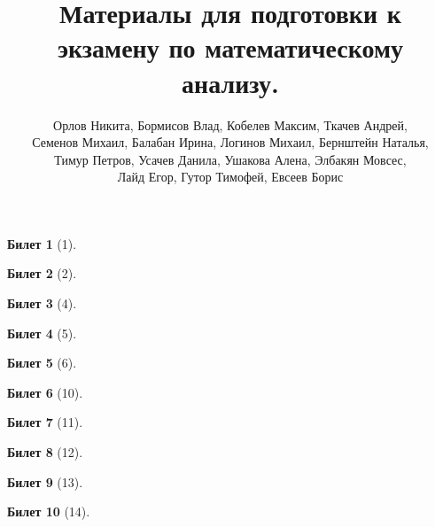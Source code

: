 \documentclass[a4paper,12pt]{article}
\newtheorem*{ticket}{Билет}
\begin{document}
	\title{Материалы для подготовки к экзамену по математическому анализу.}
	\author{
		Орлов Никита,
		Бормисов Влад,
		Кобелев Максим,
		Ткачев Андрей,\\
		Семенов Михаил,
		Балабан Ирина,
		Логинов Михаил,
		Бернштейн Наталья,\\
		Тимур Петров, 
		Усачев Данила,
		Ушакова Алена,
		Элбакян Мовсес,\\
		Лайд Егор, 
		Гутор Тимофей,
		Евсеев Борис
		}
	\maketitle
	
	\begin{ticket}[1]
		
		\newpage
	\end{ticket}
	
	\begin{ticket}[2]
		
		\newpage
	\end{ticket}
	
	
	\begin{ticket}[4]
		
		\newpage
	\end{ticket}
	
	\begin{ticket}[5]
		
		\newpage
	\end{ticket}
	
	\begin{ticket}[6]
		
		\newpage
	\end{ticket}
	
	\begin{ticket}[10]
		
		\newpage
	\end{ticket}
	
	\begin{ticket}[11]
		
		\newpage
	\end{ticket}
	
	\begin{ticket}[12]
		
		\newpage
	\end{ticket}
	
	\begin{ticket}[13]
		
		\newpage
	\end{ticket}
	
	\begin{ticket}[14]
		
		\newpage
	\end{ticket}
	
\end{document}
